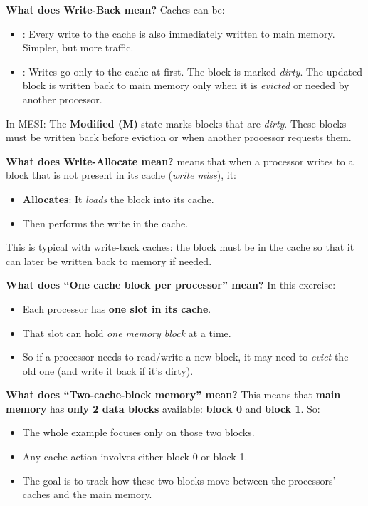 \highspace
\textcolor{Green3}{ \textbf{What does Write-Back mean?}} Caches can be:
\begin{itemize}
    \item {}: Every write to the cache is also immediately written to main memory. Simpler, but more traffic.
    \item {}: Writes go only to the cache at first. The block is marked \emph{dirty}. The updated block is written back to main memory only when it is \emph{evicted} or needed by another processor.
\end{itemize}
In MESI: The \textbf{Modified (M)} state marks blocks that are \emph{dirty}. These blocks must be written back before eviction or when another processor requests them.

\highspace
\textcolor{Green3}{ \textbf{What does Write-Allocate mean?}}  means that when a processor writes to a block that is not present in its cache (\emph{write miss}), it:
\begin{itemize}
    \item \textbf{Allocates}: It \emph{loads} the block into its cache.
    \item Then performs the write in the cache.
\end{itemize}
This is typical with write-back caches: the block must be in the cache so that it can later be written back to memory if needed.

\highspace
\textcolor{Green3}{ \textbf{What does ``One cache block per processor'' mean?}} In this exercise:
\begin{itemize}
    \item Each processor has \textbf{one slot in its cache}.
    \item That slot can hold \emph{one memory block} at a time.
    \item So if a processor needs to read/write a new block, it may need to \emph{evict} the old one (and write it back if it's dirty).
\end{itemize}
\textcolor{Green3}{ \textbf{What does ``Two-cache-block memory'' mean?}} This means that \textbf{main memory} has \textbf{only 2 data blocks} available: \textbf{block 0} and \textbf{block 1}. So:
\begin{itemize}
    \item The whole example focuses only on those two blocks.
    \item Any cache action involves either block 0 or block 1.
    \item The goal is to track how these two blocks move between the processors' caches and the main memory.
\end{itemize}

